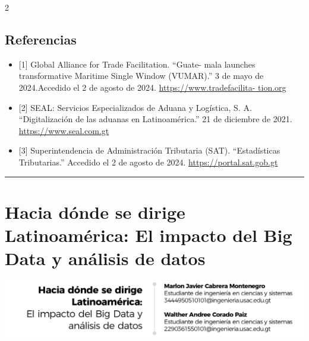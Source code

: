 \documentclass[12pt,spanish,Letterpaper,openany]{book}
\newcommand{\HRule}{\begin{center}\rule{0.5\linewidth}{0.2mm}\end{center}}
\begin{document}
\begin {multicols}{2}
\hypertarget{referencias-9}{%
\section{Referencias}\label{referencias-9}}

\begin{itemize}
\item
  {[}1{]} Global Alliance for Trade Facilitation. ``Guate-
  mala launches transformative Maritime Single Window (VUMAR).''
  3 de mayo de 2024.Accedido el 2 de agosto de 2024. \href{https://www.tradefacilitation.org/article/guatemala-launches-transformative-maritime-single-window-vumar/}{https://www.tradefacilita-
  tion.org}
\item
  {[}2{]} SEAL: Servicios Especializados de Aduana y Logística, S. A. ``Digitalización de las aduanas en Latinoamérica.''
  21 de diciembre de 2021. \href{https://www.seal.com.gt/digitalizacion-de-las-aduanas-en-latinoamerica/}{https://www.seal.com.gt}
\item
  {[}3{]} Superintendencia de Administración Tributaria (SAT). ``Estadísticas Tributarias.'' Accedido el 2 de agosto de 2024. \href{https://portal.sat.gob.gt/portal/estadisticas-tributarias-sat/\#1506903647232-dff79679-679a}{https://portal.sat.gob.gt}
\end{itemize}

\end {multicols}

\medskip

\HRule

\medskip

\hypertarget{pareja57}{%
\chapter{Hacia dónde se dirige Latinoamérica: El impacto del Big Data y análisis de datos}\label{pareja57}}

\begin{center}\includegraphics[width=1\linewidth]{autores/pareja57_01} \end{center}
\end{document}
